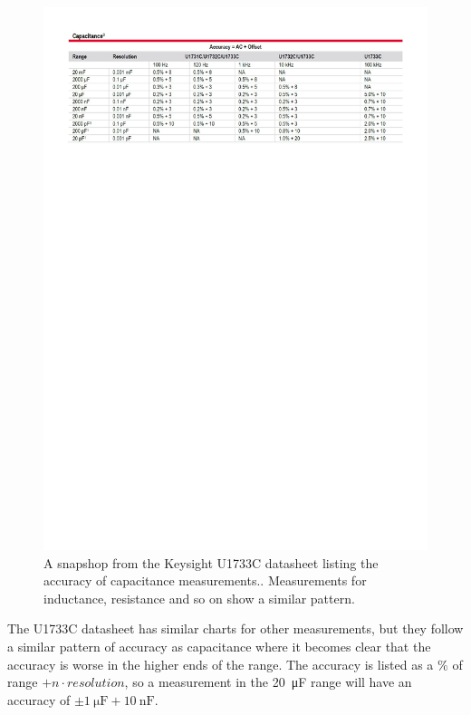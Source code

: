 \begin{figure}[H]
    \centering
    \includegraphics[clip, trim=0 630 0 0, width=1\textwidth]{Sections/2_ProblemAnalysis/FIgures/U1733CAccuracyDatasheet.pdf}
    \caption{A snapshop from the Keysight U1733C datasheet listing the accuracy of capacitance measurements.\cite{KeysightU1733CDatasheet}. Measurements for inductance, resistance and so on show a similar pattern.}
    \label{fig:2_2_U1733CCapAccurancy}
\end{figure}

The U1733C datasheet has similar charts for other measurements, but they follow a similar pattern of accuracy as capacitance where it becomes clear that the accuracy is worse in the higher ends of the range. The accuracy is listed as a $\%$ of range $ + n\cdot resolution$, so a measurement in the \SI[]{20}{\micro\farad} range will have an accuracy of $\pm \SI[]{1}{\micro\farad} + \SI[]{10}{\nano\farad}$.


